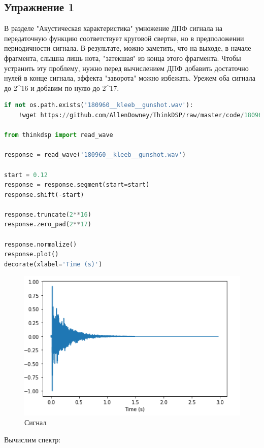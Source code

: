 \subsection{Упражнение 1}

В разделе "Акустическая характеристика" умножение ДПФ сигнала на передаточную функцию соответствует круговой свертке, но в предположении периодичности сигнала. В результате, можно заметить, что на выходе, в начале фрагмента, слышна лишь нота, "затекшая" из конца этого фрагмента. Чтобы устранить эту проблему, нужно перед вычислением ДПФ добавить достаточно нулей в конце сигнала, эффекта "заворота" можно избежать. Урежем оба сигнала до 2^16 и добавим по нулю до 2^17.

\begin{lstlisting}[language=Python]
if not os.path.exists('180960__kleeb__gunshot.wav'):
    !wget https://github.com/AllenDowney/ThinkDSP/raw/master/code/180960__kleeb__gunshot.wav
    
from thinkdsp import read_wave

response = read_wave('180960__kleeb__gunshot.wav')

start = 0.12
response = response.segment(start=start)
response.shift(-start)

response.truncate(2**16)
response.zero_pad(2**17)

response.normalize()
response.plot()
decorate(xlabel='Time (s)')
\end{lstlisting}

\begin{figure}[H]
	\begin{center}
		\includegraphics[scale=1]{fig/lab10/lab10_01.png}
		\caption{Сигнал}
	\end{center}
\end{figure}

Вычислим спектр:

